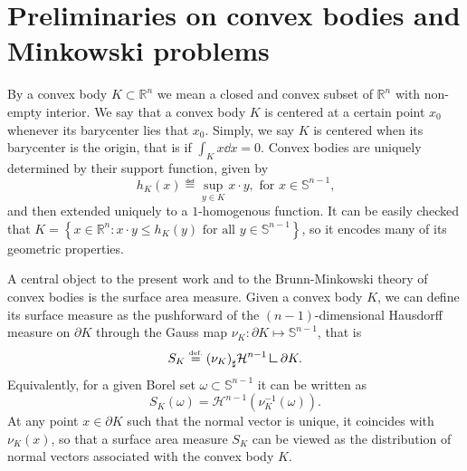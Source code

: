 \documentclass[a4paper, 10pt, twoside]{amsart}
\numberwithin{equation}{section}
\theoremstyle{plain}
\theoremstyle{definition}
\begin{document}
\section{Preliminaries on convex bodies and Minkowski problems}\label{sec.preliminaries}

By a convex body $K \subset \mathbb{R}^n$ we mean a closed and convex subset of $\mathbb{R}^n$ with non-empty interior. 
We say that a convex body $K$ is centered at a certain point $x_0$ whenever its barycenter lies that $x_0$. Simply, we say $K$ is centered when its barycenter is the origin, that is if $\displaystyle \int_K x \dd x = 0$. Convex bodies are uniquely determined by their support function, given by
\begin{equation}\label{eq.support_function}
    h_K(x) \eqdef \sup_{y \in K} x \cdot y, \text{ for $x \in \mathbb{S}^{n-1}$,}
\end{equation}
and then extended uniquely to a $1$-homogenous function. It can be easily checked that $K = \left\{ x \in \mathbb{R}^n: x\cdot y \le h_K(y) \text{ for all } y \in \mathbb{S}^{n-1} 
\right\}$, so it encodes many of its geometric properties.

A central object to the present work and to the Brunn-Minkowski theory of convex bodies is the surface area measure. Given a convex body $K$, we can define its surface measure as the pushforward of the $(n-1)$-dimensional Hausdorff measure on $\partial K$ through the Gauss map $\nu_K : \partial K \mapsto \mathbb{S}^{n-1}$, that is 
\[
    S_K \eqdef {(\nu_K)}_\sharp \mathcal{H}^{n-1}\mres \partial K. 
\]
Equivalently, for a given Borel set $\omega \subset \mathbb{S}^{n-1}$ it can be written as 
\[
    S_K(\omega) = \mathcal{H}^{n-1}(\nu_K^{-1}(\omega)). 
\] 
At any point $x\in\partial K$ such that the normal vector is unique, it coincides with $\nu_K(x)$, so that a surface area measure $S_K$ can be viewed as the distribution of normal vectors associated with the convex body $K$. 
\end{document}
